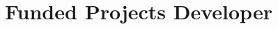 \documentclass[10pt, letterpaper]{article}
\begin{document}






    



        \section*{\small Funded Projects Developer}
\end{document}
